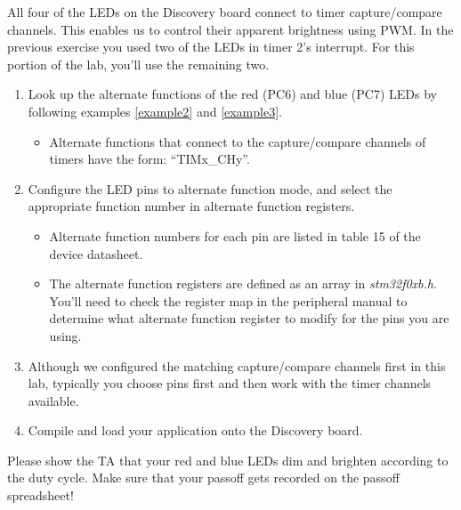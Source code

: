 \documentclass[openany,11pt,fleqn]{book} %
\begin{document}
\begin{exercise} 
    All four of the LEDs on the Discovery board connect to timer capture/compare channels. This enables us to control their apparent brightness using PWM. In the previous exercise you used two of the LEDs in timer 2's interrupt. For this portion of the lab, you'll use the remaining two. 
    
    \begin{enumerate}
        \item Look up the alternate functions of the red (PC6) and blue (PC7) LEDs by following examples \ref{example2} and \ref{example3}. 
        \begin{itemize}
            \item Alternate functions that connect to the capture/compare channels of timers have the form: ``TIMx\_CHy''.
        \end{itemize}
        \item Configure the LED pins to alternate function mode, and select the appropriate function number in alternate function registers.
        \begin{itemize}
            \item Alternate function numbers for each pin are listed in table 15 of the device datasheet.
            \item The alternate function registers are defined as an array in \textit{stm32f0xb.h}. You'll need to check the register map in the peripheral manual to determine what alternate function register to modify for the pins you are using. 
        \end{itemize}
        \item Although we configured the matching capture/compare channels first in this lab, typically you choose pins first and then work with the timer channels available. 
        \item Compile and load your application onto the Discovery board. 
    \end{enumerate} 
\end{exercise}    
    
\begin{assignment}
	Please show the TA that your red and blue LEDs dim and brighten according to the duty cycle. Make sure that your passoff gets recorded on the passoff spreadsheet!
\end{assignment}
    
\end{document}
